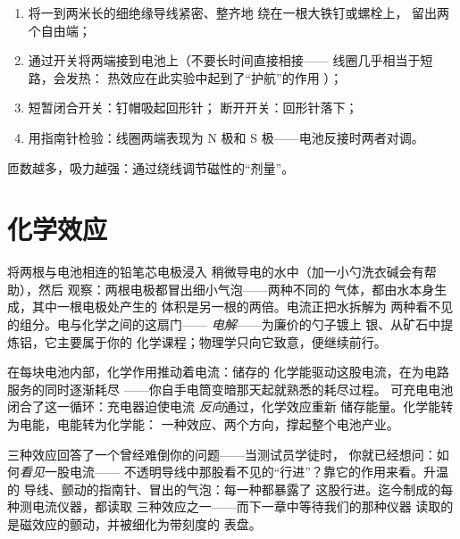 \begin{method}[绕制电磁铁]\label{met:g8:electric-current-effects:wind}
\begin{enumerate}
  \item 将一到两米长的细绝缘导线紧密、整齐地
        绕在一根大铁钉或螺栓上，
        留出两个自由端；
  \item 通过开关将两端接到电池上（不要长时间直接相接——
        线圈几乎相当于短路，会发热：
        热效应在此实验中起到了“护航”的作用
        ）；
  \item 短暂闭合开关：钉帽吸起回形针；
        断开开关：回形针落下；
  \item 用指南针检验：线圈两端表现为 N 极和
        S 极——电池反接时两者对调。
\end{enumerate}
匝数越多，吸力越强：通过绕线调节磁性的“剂量”。
\end{method}

\section{化学效应}

\begin{example}[水中的电流]\label{ex:g8:electric-current-effects:electrolysis}
将两根与电池相连的铅笔芯电极浸入
稍微导电的水中（加一小勺洗衣碱会有帮助），然后
观察：两根电极都冒出细小气泡——两种不同的
气体，都由水本身生成，其中一根电极处产生的
体积是另一根的两倍。电流正把水拆解为
两种看不见的组分。电与化学之间的这扇门——
\emph{电解}——为廉价的勺子镀上
银、从矿石中提炼铝，它主要属于你的
化学课程；物理学只向它致意，便继续前行。
\end{example}

\begin{example}[每块电池都是化学效应的逆过程]\label{ex:g8:electric-current-effects:battery}
在每块电池内部，化学作用推动着电流：储存的
化学能驱动这股电流，在为电路服务的同时逐渐耗尽
——你自手电筒变暗那天起就熟悉的耗尽过程。
可充电电池闭合了这一循环：充电器迫使电流
\emph{反向}通过，化学效应重新
储存能量。化学能转为电能，电能转为化学能：
一种效应、两个方向，撑起整个电池产业。
\end{example}

\begin{remark}[作为探测器的效应]\label{rem:g8:electric-current-effects:detect}
三种效应回答了一个曾经难倒你的问题——当测试员学徒时，
你就已经想问：如何\emph{看见}一股电流——
不透明导线中那股看不见的“行进”？靠它的作用来看。升温的
导线、颤动的指南针、冒出的气泡：每一种都暴露了
这股行进。迄今制成的每种测电流仪器，都读取
三种效应之一——而下一章中等待我们的那种仪器
读取的是磁效应的颤动，并被细化为带刻度的
表盘。
\end{remark}

